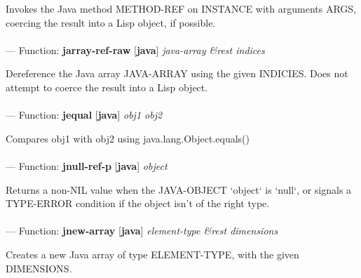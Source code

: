 \begin{adjustwidth}{5em}{5em}
Invokes the Java method METHOD-REF on INSTANCE with arguments ARGS, coercing the result into a Lisp object, if possible.
\end{adjustwidth}

\paragraph{}
\label{JAVA:JARRAY-REF-RAW}
--- Function: \textbf{jarray-ref-raw} [\textbf{java}] \textit{java-array \&rest indices}

\begin{adjustwidth}{5em}{5em}
Dereference the Java array JAVA-ARRAY using the given INDICIES. Does not attempt to coerce the result into a Lisp object.
\end{adjustwidth}

\paragraph{}
\label{JAVA:JEQUAL}
--- Function: \textbf{jequal} [\textbf{java}] \textit{obj1 obj2}

\begin{adjustwidth}{5em}{5em}
Compares obj1 with obj2 using java.lang.Object.equals()
\end{adjustwidth}

\paragraph{}
\label{JAVA:JNULL-REF-P}
--- Function: \textbf{jnull-ref-p} [\textbf{java}] \textit{object}

\begin{adjustwidth}{5em}{5em}
Returns a non-NIL value when the JAVA-OBJECT `object` is `null`,
or signals a TYPE-ERROR condition if the object isn't of
the right type.
\end{adjustwidth}

\paragraph{}
\label{JAVA:JNEW-ARRAY}
--- Function: \textbf{jnew-array} [\textbf{java}] \textit{element-type \&rest dimensions}

\begin{adjustwidth}{5em}{5em}
Creates a new Java array of type ELEMENT-TYPE, with the given DIMENSIONS.
\end{adjustwidth}


